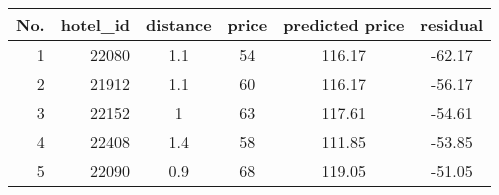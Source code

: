 \begin{tabular}{r| rcccc}
\multicolumn{1}{l}{No.} & \multicolumn{1}{l}{hotel\_id} & distance & price & predicted price & residual \\
\midrule
1     & 22080 & 1.1   & 54    & 116.17 & -62.17 \\
2     & 21912 & 1.1   & 60    & 116.17 & -56.17 \\
3     & 22152 & 1     & 63    & 117.61 & -54.61 \\
4     & 22408 & 1.4   & 58    & 111.85 & -53.85 \\
5     & 22090 & 0.9   & 68    & 119.05 & -51.05 \\
\bottomrule
\end{tabular}%

